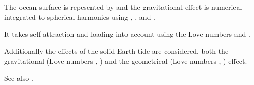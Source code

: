 The ocean surface is repesented by  and the gravitational
effect is numerical integrated to spherical harmonics using , ,
and .

It takes self attraction and loading into account using the Love numbers
 and
.

Additionally the effects of the solid Earth tide are considered,
both the gravitational (Love numbers , )
and the geometrical (Love numbers , ) effect.

See also .



